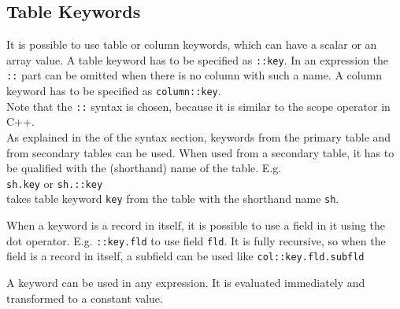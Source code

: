 \subsection{\label{TAQL:KEYWORDS}Table Keywords}
It is possible to use table or column keywords, which can have
a scalar or an array value. A table keyword has to be specified
as \texttt{::key}. In an expression the \texttt{::} part can be omitted
when there is no column with such a name.
A column keyword has to be specified as \texttt{column::key}.
\\Note that the \texttt{::} syntax is chosen, because it is similar
to the scope operator in C++.
\\
As explained in the  of the syntax
section, keywords from the primary table and from secondary tables
can be used. When used from a secondary table, it has to be qualified
with the (shorthand) name of the table. E.g.
\\\texttt{sh.key} or \texttt{sh.::key}
\\takes table keyword \texttt{key} from the table with the shorthand name
\texttt{sh}.

When a keyword is a record in itself, it is possible to use
a field in it using the dot operator. E.g. \texttt{::key.fld}
to use field \texttt{fld}. It is fully recursive, so when the
field is a record in itself, a subfield can be used like
\texttt{col::key.fld.subfld}

A keyword can be used in any expression. It is evaluated immediately
and transformed to a constant value.

